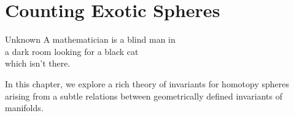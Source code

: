 \chapter{Counting Exotic Spheres}\label{chap:invariants}

\begin{epigraph}{15em}{Unknown}
	A mathematician is a blind man in \\
	a dark room looking for a black cat \\
	which isn’t there.
\end{epigraph}

In this chapter, we explore a rich theory of invariants for homotopy spheres arising from a subtle relations between geometrically defined invariants of manifolds.



